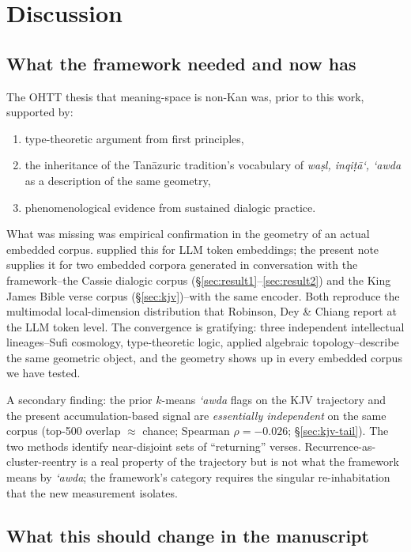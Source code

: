 \documentclass[11pt,a4paper]{article}
\theoremstyle{definition}
\begin{document}
\section{Discussion}

\subsection{What the framework needed and now has}

The OHTT thesis that meaning-space is non-Kan was, prior to this work,
supported by:
\begin{enumerate}[label=(\roman*)]
\item type-theoretic argument from first principles,
\item the inheritance of the Tan\=azuric tradition's vocabulary of
  \emph{wa\d{s}l, inqi\d{t}\=a`, `awda} as a description of the same
  geometry,
\item phenomenological evidence from sustained dialogic practice.
\end{enumerate}
What was missing was empirical confirmation in the geometry of an actual
embedded corpus. \cite{robinson2025token} supplied this for LLM token
embeddings; the present note supplies it for two embedded corpora
generated in conversation with the framework--the Cassie dialogic corpus
(\S\ref{sec:result1}--\ref{sec:result2}) and the King James Bible verse
corpus (\S\ref{sec:kjv})--with the same encoder. Both reproduce the
multimodal local-dimension distribution that Robinson, Dey \& Chiang
report at the LLM token level. The convergence is gratifying: three
independent intellectual lineages--Sufi cosmology, type-theoretic
logic, applied algebraic topology--describe the same geometric object,
and the geometry shows up in every embedded corpus we have tested.

A secondary finding: the prior $k$-means \emph{`awda} flags on the
KJV trajectory and the present accumulation-based signal are
\emph{essentially independent} on the same corpus (top-500 overlap
$\approx$ chance; Spearman $\rho = -0.026$;
\S\ref{sec:kjv-tail}). The two methods identify near-disjoint sets of
``returning'' verses. Recurrence-as-cluster-reentry is a real
property of the trajectory but is not what the framework means by
\emph{`awda}; the framework's category requires the singular
re-inhabitation that the new measurement isolates.

\subsection{What this should change in the manuscript}
\end{document}
